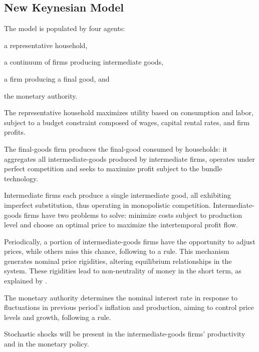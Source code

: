 \documentclass[
thesis.tex
]{subfiles}
\begin{document}
\newpage


\subsection*{New Keynesian Model}\label{sec:nk-model}

	The model is populated by four agents: 
	\begin{enumerate*}[label=(\arabic*)]
	\item a representative household,
	\item a continuum of firms producing intermediate goods,
	\item a firm producing a final good, and
	\item the monetary authority.
	\end{enumerate*}

	The representative household maximizes utility based on consumption and labor, subject to a budget constraint composed of wages, capital rental rates, and firm profits.
	
	The final-goods firm produces the final-good consumed by households: it aggregates all intermediate-goods produced by intermediate firms, operates under perfect competition and seeks to maximize profit subject to the bundle technology.
	
	Intermediate firms each produce a single intermediate good, all exhibiting imperfect substitution, thus operating in monopolistic competition. Intermediate-goods firms have two problems to solve: minimize costs subject to production level and choose an optimal price to maximize the intertemporal profit flow.
	
	Periodically, a portion of intermediate-goods firms have the opportunity to adjust prices, while others miss this chance, following to a \textcite{calvo_staggered_1983} rule. This mechanism generates nominal price rigidities, altering equilibrium relationships in the system. These rigidities lead to non-neutrality of money in the short term, as explained by \textcite[p.191]{costa_junior_understanding_2016}.
	
	The monetary authority determines the nominal interest rate in response to fluctuations in previous period's inflation and production, aiming to control price levels and growth, following a \textcite{taylor_discretion_1993} rule.
	
	Stochastic shocks will be present in the intermediate-goods firms' productivity and in the monetary policy.
	
\end{document}
